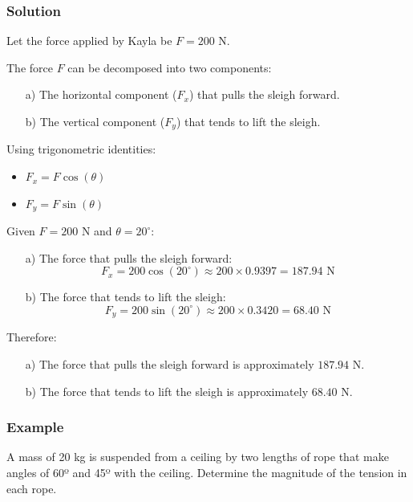 \documentclass{article}
\begin{document}
\subsubsection*{Solution}

Let the force applied by Kayla be \( F = 200 \text{ N} \).

The force \( F \) can be decomposed into two components:
\begin{enumerate}
    \item[a)] The horizontal component (\( F_x \)) that pulls the sleigh forward.
    \item[b)] The vertical component (\( F_y \)) that tends to lift the sleigh.
\end{enumerate}

Using trigonometric identities:
\begin{itemize}
    \item \( F_x = F \cos(\theta) \)
    \item \( F_y = F \sin(\theta) \)
\end{itemize}

Given \( F = 200 \text{ N} \) and \( \theta = 20^\circ \):

\begin{enumerate}
    \item[a)] The force that pulls the sleigh forward:
    \[
    F_x = 200 \cos(20^\circ) \approx 200 \times 0.9397 = 187.94 \text{ N}
    \]
    \item[b)] The force that tends to lift the sleigh:
    \[
    F_y = 200 \sin(20^\circ) \approx 200 \times 0.3420 = 68.40 \text{ N}
    \]
\end{enumerate}

Therefore:
\begin{itemize}
    \item[a)] The force that pulls the sleigh forward is approximately \( 187.94 \text{ N} \).
    \item[b)] The force that tends to lift the sleigh is approximately \( 68.40 \text{ N} \).
\end{itemize}
\subsubsection*{Example}
A mass of 20 kg is suspended from a ceiling by two lengths of rope that make angles of 60º and 45º with the ceiling. Determine the magnitude of the tension in each rope.
\end{document}
